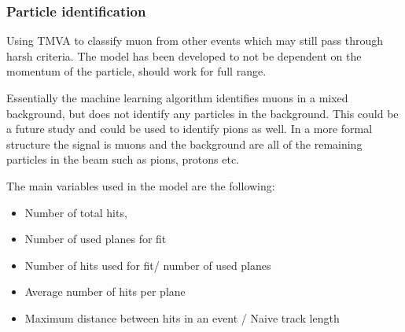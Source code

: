 






\clearpage
\subsubsection{Particle identification}

Using TMVA to classify muon from other events which may still pass through harsh criteria. The model has been developed to not be dependent on the momentum of the particle, should work for full range.

Essentially the machine learning algorithm identifies muons in a mixed background, but does not identify any particles in the background. This could be a future study and could be used to identify pions as well. In a more formal structure the signal is muons and the background are all of the remaining particles in the beam such as pions, protons etc.

The main variables used in the model are the following:
\begin{itemize}
\item Number of total hits,
\item Number of used planes for fit
\item Number of hits used for fit/ number of used planes
\item Average number of hits per plane
\item Maximum distance between hits in an event / Naive track length
\end{itemize}

